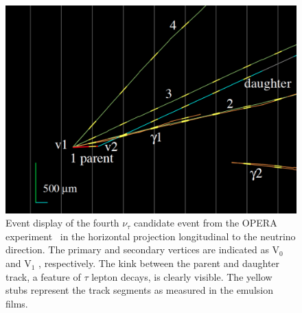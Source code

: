 \begin{figure}[htbp]
\centering
\includegraphics[width=0.6\linewidth]{figures/tau4.pdf}
  \caption{
Event display of the fourth $\nu_\tau$ candidate event from the OPERA 
experiment~\cite{DICRESCENZO2015186} in the
horizontal projection longitudinal to the neutrino direction.
The primary and secondary vertices are indicated as V$_0$ and
V$_1$ , respectively. The kink between the parent and daughter track, a feature of $\tau$ lepton decays, is clearly visible. The yellow stubs represent the track segments as measured in the emulsion films.  
}
 \label{fig:opera}
 \end{figure}

